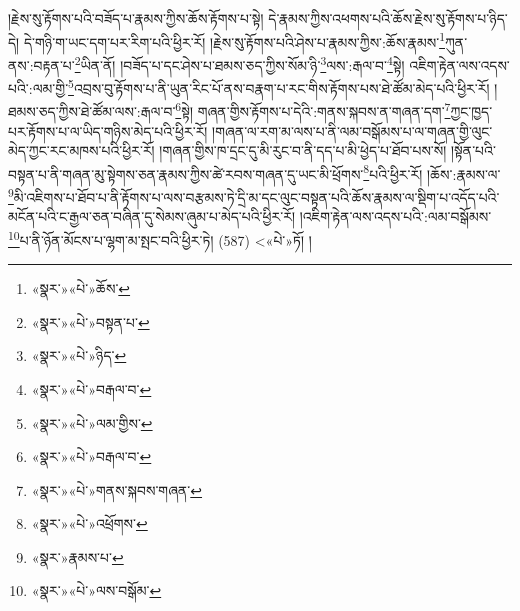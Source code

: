 །རྗེས་སུ་རྟོགས་པའི་བཟོད་པ་རྣམས་ཀྱིས་ཆོས་རྟོགས་པ་སྟེ། དེ་རྣམས་ཀྱིས་འཕགས་པའི་ཆོས་རྗེས་སུ་རྟོགས་པ་ཉིད་དེ། དེ་གཉི་ག་ཡང་དག་པར་རིག་པའི་ཕྱིར་རོ། །རྗེས་སུ་རྟོགས་པའི་ཤེས་པ་རྣམས་ཀྱིས་:ཆོས་རྣམས་\footnote{«སྣར་»«པེ་»ཆོས་}ཀུན་ནས་:བརྟན་པ་\footnote{«སྣར་»«པེ་»བསྟན་པ་}ཡིན་ནོ། །བཟོད་པ་དང་ཤེས་པ་ཐམས་ཅད་ཀྱིས་སོམ་ཉི་\footnote{«སྣར་»«པེ་»ཉིད་}ལས་:རྒལ་བ་\footnote{«སྣར་»«པེ་»བརྒལ་བ་}སྟེ། འཇིག་རྟེན་ལས་འདས་པའི་:ལམ་གྱི་\footnote{«སྣར་»«པེ་»ལམ་གྱིས་}འབྲས་བུ་རྟོགས་པ་ནི་ཡུན་རིང་པོ་ནས་བརྣག་པ་རང་གིས་རྟོགས་པས་ཐེ་ཚོམ་མེད་པའི་ཕྱིར་རོ། །ཐམས་ཅད་ཀྱིས་ཐེ་ཚོམ་ལས་:རྒལ་བ་\footnote{«སྣར་»«པེ་»བརྒལ་བ་}སྟེ། གཞན་གྱིས་རྟོགས་པ་དེའི་:གནས་སྐབས་ན་གཞན་དག་\footnote{«སྣར་»«པེ་»གནས་སྐབས་གཞན་}ཀྱང་ཁྱད་པར་རྟོགས་པ་ལ་ཡིད་གཉིས་མེད་པའི་ཕྱིར་རོ། །གཞན་ལ་རག་མ་ལས་པ་ནི་ལམ་བསྒོམས་པ་ལ་གཞན་གྱི་ལུང་མེད་ཀྱང་རང་མཁས་པའི་ཕྱིར་རོ། །གཞན་གྱིས་ཁ་དྲང་དུ་མི་རུང་བ་ནི་དད་པ་མི་ཕྱེད་པ་ཐོབ་པས་སོ། །སྟོན་པའི་བསྟན་པ་ནི་གཞན་མུ་སྟེགས་ཅན་རྣམས་ཀྱིས་ཚེ་རབས་གཞན་དུ་ཡང་མི་ཕྲོགས་\footnote{«སྣར་»«པེ་»འཕྲོགས་}པའི་ཕྱིར་རོ། །ཆོས་:རྣམས་ལ་\footnote{«སྣར་»རྣམས་པ་}མི་འཇིགས་པ་ཐོབ་པ་ནི་རྟོགས་པ་ལས་བརྩམས་ཏེ་དྲི་མ་དང་ལུང་བསྟན་པའི་ཆོས་རྣམས་ལ་སྡིག་པ་འདོད་པའི་མངོན་པའི་ང་རྒྱལ་ཅན་བཞིན་དུ་སེམས་ཞུམ་པ་མེད་པའི་ཕྱིར་རོ། །འཇིག་རྟེན་ལས་འདས་པའི་:ལམ་བསྒོམས་\footnote{«སྣར་»«པེ་»ལས་བསྒོམ་}པ་ནི་ཉོན་མོངས་པ་ལྷག་མ་སྤང་བའི་ཕྱིར་ཏེ། (587) <«པེ་»ཏོ། །
